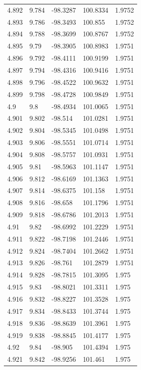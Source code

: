 \begin{tabular}{lllll}
4.892 & 9.784 & -98.3287 & 100.8334 & 1.9752 \\
4.893 & 9.786 & -98.3493 & 100.855 & 1.9752 \\
4.894 & 9.788 & -98.3699 & 100.8767 & 1.9752 \\
4.895 & 9.79 & -98.3905 & 100.8983 & 1.9751 \\
4.896 & 9.792 & -98.4111 & 100.9199 & 1.9751 \\
4.897 & 9.794 & -98.4316 & 100.9416 & 1.9751 \\
4.898 & 9.796 & -98.4522 & 100.9632 & 1.9751 \\
4.899 & 9.798 & -98.4728 & 100.9849 & 1.9751 \\
4.9 & 9.8 & -98.4934 & 101.0065 & 1.9751 \\
4.901 & 9.802 & -98.514 & 101.0281 & 1.9751 \\
4.902 & 9.804 & -98.5345 & 101.0498 & 1.9751 \\
4.903 & 9.806 & -98.5551 & 101.0714 & 1.9751 \\
4.904 & 9.808 & -98.5757 & 101.0931 & 1.9751 \\
4.905 & 9.81 & -98.5963 & 101.1147 & 1.9751 \\
4.906 & 9.812 & -98.6169 & 101.1363 & 1.9751 \\
4.907 & 9.814 & -98.6375 & 101.158 & 1.9751 \\
4.908 & 9.816 & -98.658 & 101.1796 & 1.9751 \\
4.909 & 9.818 & -98.6786 & 101.2013 & 1.9751 \\
4.91 & 9.82 & -98.6992 & 101.2229 & 1.9751 \\
4.911 & 9.822 & -98.7198 & 101.2446 & 1.9751 \\
4.912 & 9.824 & -98.7404 & 101.2662 & 1.9751 \\
4.913 & 9.826 & -98.761 & 101.2879 & 1.9751 \\
4.914 & 9.828 & -98.7815 & 101.3095 & 1.975 \\
4.915 & 9.83 & -98.8021 & 101.3311 & 1.975 \\
4.916 & 9.832 & -98.8227 & 101.3528 & 1.975 \\
4.917 & 9.834 & -98.8433 & 101.3744 & 1.975 \\
4.918 & 9.836 & -98.8639 & 101.3961 & 1.975 \\
4.919 & 9.838 & -98.8845 & 101.4177 & 1.975 \\
4.92 & 9.84 & -98.905 & 101.4394 & 1.975 \\
4.921 & 9.842 & -98.9256 & 101.461 & 1.975 \\

\end{tabular}

